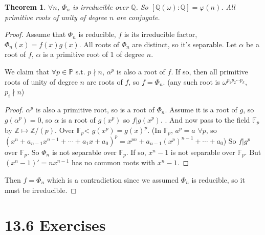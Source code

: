 \documentclass[9pt,reqno,twoside]{amsbook}
\theoremstyle{plain}
\newtheorem{theorem}{Theorem}[chapter]
\numberwithin{section}{chapter}
\numberwithin{equation}{chapter}
\theoremstyle{definition}
\theoremstyle{remark}
\theoremstyle{plain}
\newcommand{\z}{\mathbb{Z}}
\newcommand{\Q}{\mathbb{Q}}
\newcommand{\F}{\mathbb{F}}
\renewcommand{\phi}{\varphi}
\begin{document}
\begin{theorem}
$\forall n$, $\Phi_n$ is irreducible over $\Q$. So $[\Q(\omega):\Q] = \phi(n)$. All primitive roots of unity of degree $n$ are conjugate. 
\end{theorem}


\begin{proof}


Assume that $\Phi_n$ is reducible, $f$ is its irreducible factor, $\Phi_n(x) = f(x)g(x)$. All roots of $\Phi_n$ are distinct, so it's separable. Let $\alpha$ be a root of $f$, $\alpha$ is a primitive root of 1 of degree $n$. 


We claim that $\forall p \in \mathbb{P}$ s.t. $p\nmid n$, $\alpha^p$ is also a root of $f$. If so, then all primitive roots of unity of degree $n$ are roots of $f$, so $f = \Phi_n$. (any such root is $\omega^{p_1p_2\cdots p_k}$, $p_i\nmid n$)

\begin{proof}
$\alpha^p$ is also a primitive root, so is a root of $\Phi_n$. Assume it is a root of $g$, so $g(\alpha^p) = 0$, so $\alpha$ is a root of $g(x^p)$ so $f|g(x^p)$. . And now pass to the field $\F_p$ by $\z \mapsto \z/(p)$. Over $\F_p$< $g(x^p) = g(x)^p$. (In $\F_p$, $a^p = a$ $\forall p$, so $(x^n + a_{n - 1}x^{n - 1} + \cdots + a_1x + a_0)^p = x^{pn} + a_{n - 1}(x^p)^{n - 1} + \cdots + a_0$) So $f|g^p$ over $\F_p$. So $\Phi_n$ is not separable over $\F_p$. If so, $x^n - 1$ is not separable over $\F_p$. But $(x^n - 1)' = nx^{n - 1}$ has no common roots with $x^n - 1$. 
\end{proof}
Then $f = \Phi_n$ which is a contradiction since we assumed $\Phi_n$ is reducible, so it must be irreducible. 
\end{proof}



\section*{13.6 Exercises}
\end{document}
